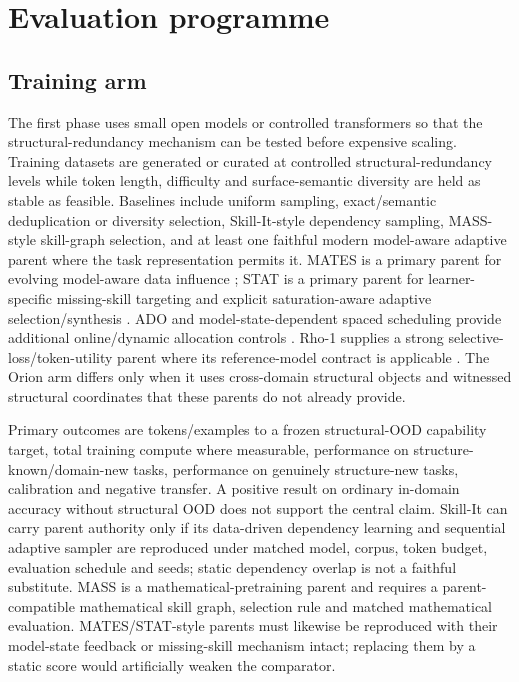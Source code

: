 \section{Evaluation programme}

\subsection{Training arm}

The first phase uses small open models or controlled transformers so that the structural-redundancy mechanism can be tested before expensive scaling. Training datasets are generated or curated at controlled structural-redundancy levels while token length, difficulty and surface-semantic diversity are held as stable as feasible. Baselines include uniform sampling, exact/semantic deduplication or diversity selection, Skill-It-style dependency sampling, MASS-style skill-graph selection, and at least one faithful modern model-aware adaptive parent where the task representation permits it. MATES is a primary parent for evolving model-aware data influence \cite{yu2024mates}; STAT is a primary parent for learner-specific missing-skill targeting and explicit saturation-aware adaptive selection/synthesis \cite{he2026stat}. ADO and model-state-dependent spaced scheduling provide additional online/dynamic allocation controls \cite{jiang2025ado,elhattami2025sst}. Rho-1 supplies a strong selective-loss/token-utility parent where its reference-model contract is applicable \cite{lin2024rho1}. The Orion arm differs only when it uses cross-domain structural objects and witnessed structural coordinates that these parents do not already provide.

Primary outcomes are tokens/examples to a frozen structural-OOD capability target, total training compute where measurable, performance on structure-known/domain-new tasks, performance on genuinely structure-new tasks, calibration and negative transfer. A positive result on ordinary in-domain accuracy without structural OOD does not support the central claim. Skill-It can carry parent authority only if its data-driven dependency learning and sequential adaptive sampler are reproduced under matched model, corpus, token budget, evaluation schedule and seeds; static dependency overlap is not a faithful substitute. MASS is a mathematical-pretraining parent and requires a parent-compatible mathematical skill graph, selection rule and matched mathematical evaluation. MATES/STAT-style parents must likewise be reproduced with their model-state feedback or missing-skill mechanism intact; replacing them by a static score would artificially weaken the comparator.

